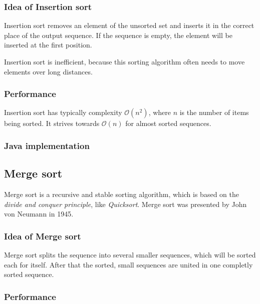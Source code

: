 \documentclass[]{pfBook}
\newcommand{\OO}{\mathcal{O}}
\begin{document}
	\subsubsection{Idea of Insertion sort}
	
	Insertion sort removes an element of the unsorted set and inserts it in the correct place of the output sequence. If the sequence is empty, the element will be inserted at the first position.
	
	Insertion sort is inefficient, because this sorting algorithm often needs to move elements over long distances.
	
	\subsubsection{Performance}
	
	Insertion sort has typically complexity $\OO(n^2)$, where $n$ is the number of items being sorted. It strives towards $\OO(n)$ for almost sorted sequences.
	
	\subsubsection{Java implementation}
	
	
	
	\subsection{Merge sort}
	
	Merge sort is a recursive and stable sorting algorithm, which is based on the \emph{divide and conquer principle}, like \emph{Quicksort}. Merge sort was presented by John von Neumann in 1945.
	
	\subsubsection{Idea of Merge sort}
	
	Merge sort splits the sequence into several smaller sequences, which will be sorted each for itself. After that the sorted, small sequences are united in one completly sorted sequence.
	
	\subsubsection{Performance}
	
\end{document}
